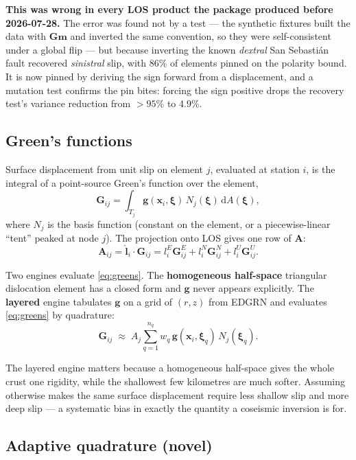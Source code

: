 \documentclass[11pt,a4paper]{article}
\newcommand{\A}{\mathbf{A}}
\newcommand{\G}{\mathbf{G}}
\newcommand{\bfm}{\bm{m}}
\newcommand{\note}[1]{\textcolor{red!60!black}{\textbf{#1}}}
\begin{document}
\note{This was wrong in every LOS product the package produced before 2026-07-28.}
The error was found not by a test --- the synthetic fixtures built the data with
$\G\bfm$ and inverted the same convention, so they were self-consistent under a
global flip --- but because inverting the known \emph{dextral} San Sebasti\'an
fault recovered \emph{sinistral} slip, with 86\% of elements pinned on the
polarity bound. It is now pinned by deriving the sign forward from a
displacement, and a mutation test confirms the pin bites: forcing the sign
positive drops the recovery test's variance reduction from $>95\%$ to 4.9\%.

\subsection{Green's functions}

Surface displacement from unit slip on element $j$, evaluated at station $i$, is
the integral of a point-source Green's function over the element,
\begin{equation}
\G_{ij} = \int_{T_j} \bm{g}(\bm{x}_i, \bm{\xi})\, N_j(\bm{\xi})\, \mathrm{d}A(\bm{\xi}),
\label{eq:greens}
\end{equation}
where $N_j$ is the basis function (constant on the element, or a piecewise-linear
``tent'' peaked at node $j$). The projection onto LOS gives one row of $\A$:
\begin{equation}
\A_{ij} = \hat{\bm{l}}_i \cdot \G_{ij}
        = l^E_i \G^E_{ij} + l^N_i \G^N_{ij} + l^U_i \G^U_{ij}.
\end{equation}

Two engines evaluate \eqref{eq:greens}. The \textbf{homogeneous half-space}
triangular dislocation element has a closed form and $\bm{g}$ never appears
explicitly. The \textbf{layered} engine tabulates $\bm{g}$ on a grid of
$(r, z)$ from EDGRN and evaluates \eqref{eq:greens} by quadrature:
\begin{equation}
\G_{ij} \;\approx\; A_j \sum_{q=1}^{n_q} w_q\, \bm{g}(\bm{x}_i, \bm{\xi}_q)\, N_j(\bm{\xi}_q).
\label{eq:quad}
\end{equation}

The layered engine matters because a homogeneous half-space gives the whole crust
one rigidity, while the shallowest few kilometres are much softer. Assuming
otherwise makes the same surface displacement require less shallow slip and more
deep slip --- a systematic bias in exactly the quantity a coseismic inversion is
for.

\subsection{Adaptive quadrature (novel)}
\label{sec:quad}
\end{document}
